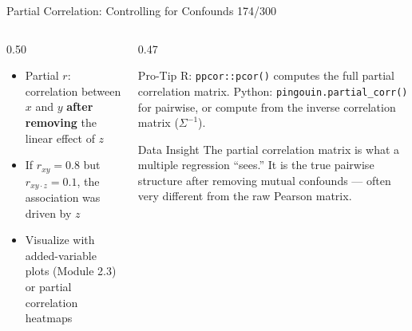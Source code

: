 \documentclass[10pt]{beamer}
\newcommand{\smark}[1]{\hfill{\scriptsize\color{codegray}#1}}
\begin{document}
\begin{frame}{Partial Correlation: Controlling for Confounds}
\smark{174/300}
\begin{columns}[T]
\begin{column}{0.50\textwidth}
\begin{itemize}
    \item Partial $r$: correlation between $x$ and $y$ \textbf{after removing} the linear effect of $z$
    \item If $r_{xy} = 0.8$ but $r_{xy \cdot z} = 0.1$, the association was driven by $z$
    \item Visualize with added-variable plots (Module 2.3) or partial correlation heatmaps
\end{itemize}
\end{column}
\begin{column}{0.47\textwidth}
\begin{alertblock}{Pro-Tip}
    \scriptsize R: \texttt{ppcor::pcor()} computes the full partial correlation matrix. Python: \texttt{pingouin.partial\_corr()} for pairwise, or compute from the inverse correlation matrix ($\Sigma^{-1}$).
\end{alertblock}
\vspace{0.1cm}
\begin{exampleblock}{Data Insight}
    \scriptsize The partial correlation matrix is what a multiple regression ``sees.'' It is the true pairwise structure after removing mutual confounds --- often very different from the raw Pearson matrix.
\end{exampleblock}
\end{column}
\end{columns}
\end{frame}
\end{document}
